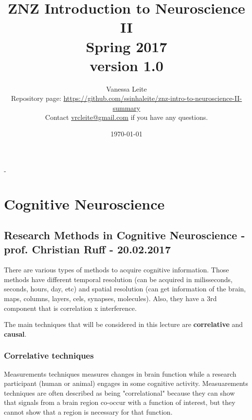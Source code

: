 \documentclass[12pt,article,oneside,a4paper]{memoir}
\title{\textbf{ZNZ Introduction to Neuroscience II} \\
       Spring 2017\\\normalsize version 1.0}
\author{
	Vanessa Leite
	\vspace{2em}
	\\Repository page: \url{https://github.com/ssinhaleite/znz-intro-to-neuroscience-II-summary}\\
	Contact \href{mailto:vrcleite@gmail.com}{vrcleite@gmail.com} if you have any questions.}
\date{\today}
\begin{document}
\frontmatter


\begin{titlingpage}
  \calccentering{\unitlength}
  \begin{adjustwidth*}{\unitlength-24pt}{-\unitlength-24pt}
    \maketitle
  \end{adjustwidth*}
\end{titlingpage}

\mainmatter



\newpage
\clearpage
{}
\setcounter{tocdepth}{3}
\setcounter{secnumdepth}{2}
\tableofcontents

\clearpage
{}

\section{Cognitive Neuroscience}
\subsection{Research Methods in Cognitive Neuroscience - prof. Christian Ruff - 20.02.2017}

There are various types of methods to acquire cognitive information. Those methods have different temporal resolution (can be acquired in milisseconds, seconds, hours, day, etc) and spatial resolution (can get information of the brain, maps, columns, layers, cels, synapses, molecules). Also, they have a 3rd component that is correlation x interference.

The main techniques that will be considered in this lecture are \textbf{correlative} and \textbf{causal}.
\subsubsection{Correlative techniques}

Measurements techniques measures changes in brain function while a research participant (human or animal) engages in some cognitive activity. Measuarements techniques are often described as being "correlational" because they can show that signals from a brain region co-occur with a function of interest, but they cannot show that a region is necessary for that function.
\end{document}
